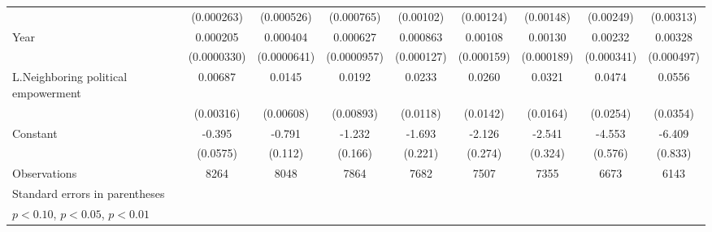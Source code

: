 \begin{table}[htbp]
\begin{tabular}{l*{8}{c}}
                    &  (0.000263)         &  (0.000526)         &  (0.000765)         &   (0.00102)         &   (0.00124)         &   (0.00148)         &   (0.00249)         &   (0.00313)         \\
[1em]
Year                &    0.000205\sym{***}&    0.000404\sym{***}&    0.000627\sym{***}&    0.000863\sym{***}&     0.00108\sym{***}&     0.00130\sym{***}&     0.00232\sym{***}&     0.00328\sym{***}\\
                    & (0.0000330)         & (0.0000641)         & (0.0000957)         &  (0.000127)         &  (0.000159)         &  (0.000189)         &  (0.000341)         &  (0.000497)         \\
[1em]
L.Neighboring political empowerment&     0.00687\sym{**} &      0.0145\sym{**} &      0.0192\sym{**} &      0.0233\sym{*}  &      0.0260\sym{*}  &      0.0321\sym{*}  &      0.0474\sym{*}  &      0.0556         \\
                    &   (0.00316)         &   (0.00608)         &   (0.00893)         &    (0.0118)         &    (0.0142)         &    (0.0164)         &    (0.0254)         &    (0.0354)         \\
[1em]
Constant            &      -0.395\sym{***}&      -0.791\sym{***}&      -1.232\sym{***}&      -1.693\sym{***}&      -2.126\sym{***}&      -2.541\sym{***}&      -4.553\sym{***}&      -6.409\sym{***}\\
                    &    (0.0575)         &     (0.112)         &     (0.166)         &     (0.221)         &     (0.274)         &     (0.324)         &     (0.576)         &     (0.833)         \\
\hline
Observations        &        8264         &        8048         &        7864         &        7682         &        7507         &        7355         &        6673         &        6143         \\
\hline\hline
\multicolumn{9}{l}{\footnotesize Standard errors in parentheses}\\
\multicolumn{9}{l}{\footnotesize \sym{*} \(p<0.10\), \sym{**} \(p<0.05\), \sym{***} \(p<0.01\)}\\
\end{tabular}
\end{table}
